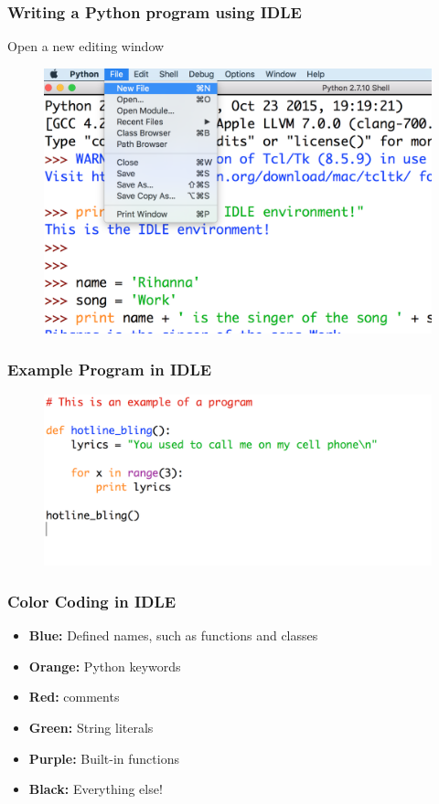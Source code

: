 \documentclass{beamer}
\newcommand{\<}{\langle}
\renewcommand{\>}{\rangle}
\begin{document}
\begin{frame}
\frametitle{Writing a Python program using IDLE}

Open a new editing window

\begin{figure}
\centering
\includegraphics[scale=.4]{IMG/4idle.png}
\end{figure}
\end{frame}





\begin{frame}
\frametitle{Example Program in IDLE}

\begin{figure}
\centering
\includegraphics[scale=.4]{IMG/5idle.png}
\end{figure}
\end{frame}

\begin{frame}
\frametitle{Color Coding in IDLE}

\begin{itemize}
\item \color{blue} \textbf{Blue:} Defined names, such as functions and classes
\item \color{orange} \textbf{Orange:} Python keywords
\item \color{red} \textbf{Red:} comments
\item \color{green} \textbf{Green:} String literals
\item \color{purple} \textbf{Purple:} Built-in functions
\item \color{black} \textbf{Black:} Everything else!
\end{itemize}
\end{frame}
\end{document}
